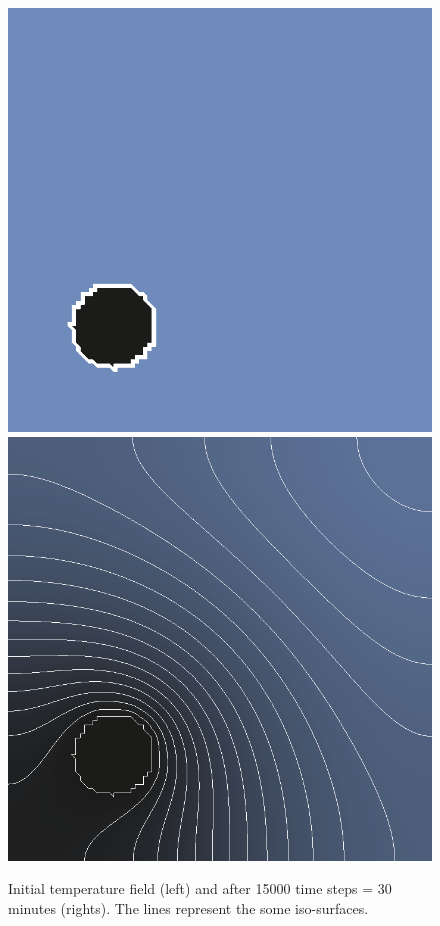 \begin{figure}[!htb]
  \centering
  \includegraphics[width=.4\textwidth]{figures/hot-point-1}
  \hfill
  \includegraphics[width=.4\textwidth]{figures/hot-point-2}
  \caption{Initial temperature field (left) and after 15000 time steps = 30 minutes (rights). The lines represent the some iso-surfaces.}
  \label{fig:htm:explicit:dynamic}
\end{figure}

